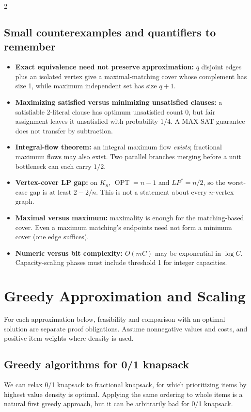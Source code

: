 \documentclass[8pt]{extarticle}
\theoremstyle{definition}
\newcommand{\OPT}{\operatorname{OPT}}
\begin{document}
\begin{multicols*}{2}
\subsection{Small counterexamples and quantifiers to remember}
\begin{itemize}
\item \textbf{Exact equivalence need not preserve approximation:} $q$ disjoint edges plus
an isolated vertex give a maximal-matching cover whose complement has size 1, while
maximum independent set has size $q+1$.
\item \textbf{Maximizing satisfied versus minimizing unsatisfied clauses:} a satisfiable
2-literal clause has optimum unsatisfied count 0, but fair assignment leaves it unsatisfied
with probability $1/4$. A MAX-SAT guarantee does not transfer by subtraction.
\item \textbf{Integral-flow theorem:} an integral maximum flow \emph{exists}; fractional
maximum flows may also exist. Two parallel branches merging before a unit bottleneck can
each carry $1/2$.
\item \textbf{Vertex-cover LP gap:} on $K_n$, $\OPT=n-1$ and $LP^*=n/2$, so the
worst-case gap is at least $2-2/n$. This is not a statement about every $n$-vertex graph.
\item \textbf{Maximal versus maximum:} maximality is enough for the matching-based cover.
Even a maximum matching's endpoints need not form a minimum cover (one edge suffices).
\item \textbf{Numeric versus bit complexity:} $O(mC)$ may be exponential in $\log C$.
Capacity-scaling phases must include threshold 1 for integer capacities.
\end{itemize}



\section{Greedy Approximation and Scaling}\label{gre:main}
For each approximation below, feasibility and comparison with an optimal solution are separate proof obligations. Assume nonnegative values and costs, and positive item weights where density is used.

\subsection{Greedy algorithms for 0/1 knapsack}\label{gre:knapsack}
We can relax 0/1 knapsack to fractional knapsack, for which prioritizing items by highest value density is optimal. Applying the same ordering to whole items is a natural first greedy approach, but it can be arbitrarily bad for 0/1 knapsack.


\end{multicols*}
\end{document}
